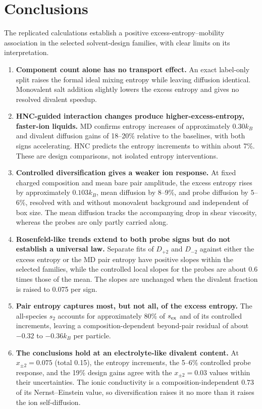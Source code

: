 \documentclass[aps,pre,twocolumn,superscriptaddress,floatfix]{revtex4-2}
\begin{document}
\section{Conclusions}

The replicated calculations establish a positive excess-entropy--mobility association in the selected solvent-design families, with clear limits on its interpretation.
\begin{enumerate}
\item \textbf{Component count alone has no transport effect.} An exact label-only split raises the formal ideal mixing entropy while leaving diffusion identical. Monovalent salt addition slightly lowers the excess entropy and gives no resolved divalent speedup.
\item \textbf{HNC-guided interaction changes produce higher-excess-entropy, faster-ion liquids.} MD confirms entropy increases of approximately $0.30k_B$ and divalent diffusion gains of 18--20\% relative to the baselines, with both signs accelerating. HNC predicts the entropy increments to within about 7\%. These are design comparisons, not isolated entropy interventions.
\item \textbf{Controlled diversification gives a weaker ion response.} At fixed charged composition and mean bare pair amplitude, the excess entropy rises by approximately $0.103k_B$, mean diffusion by 8--9\%, and probe diffusion by $5$--$6\%$, resolved with and without monovalent background and independent of box size. The mean diffusion tracks the accompanying drop in shear viscosity, whereas the probes are only partly carried along.
\item \textbf{Rosenfeld-like trends extend to both probe signs but do not establish a universal law.} Separate fits of $D_{+2}$ and $D_{-2}$ against either the excess entropy or the MD pair entropy have positive slopes within the selected families, while the controlled local slopes for the probes are about 0.6 times those of the mean. The slopes are unchanged when the divalent fraction is raised to 0.075 per sign.
\item \textbf{Pair entropy captures most, but not all, of the excess entropy.} The all-species $s_2$ accounts for approximately 80\% of $s_{\rm ex}$ and of its controlled increments, leaving a composition-dependent beyond-pair residual of about $-0.32$ to $-0.36k_B$ per particle.
\item \textbf{The conclusions hold at an electrolyte-like divalent content.} At $x_{\pm2}=0.075$ (total 0.15), the entropy increments, the 5--6\% controlled probe response, and the 19\% design gains agree with the $x_{\pm2}=0.03$ values within their uncertainties. The ionic conductivity is a composition-independent $0.73$ of its Nernst--Einstein value, so diversification raises it no more than it raises the ion self-diffusion.
\end{enumerate}
\end{document}
